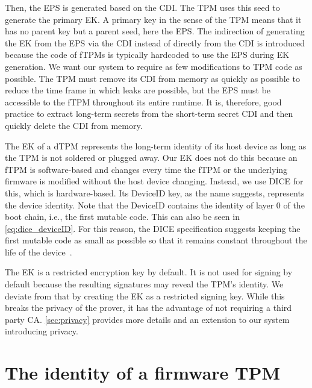 Then, the \ac{EPS} is generated based on the \ac{CDI}\@.
The \ac{TPM} uses this seed to generate the primary \ac{EK}.
A primary key in the sense of the TPM means that it has no parent key but a parent seed, here the \ac{EPS}\@.
The indirection of generating the \ac{EK} from the \ac{EPS} via the \ac{CDI} instead of directly from the \ac{CDI} is introduced because the code of fTPMs is typically hardcoded to use the \ac{EPS} during \ac{EK} generation.
We want our system to require as few modifications to TPM code as possible.
The \ac{TPM} must remove its \ac{CDI} from memory as quickly as possible to reduce the time frame in which leaks are possible, but the \ac{EPS} must be accessible to the \ac{fTPM} throughout its entire runtime.
It is, therefore, good practice to extract long-term secrets from the short-term secret \ac{CDI} and then quickly delete the \ac{CDI} from memory.


The \ac{EK} of a \ac{dTPM} represents the long-term identity of its host device as long as the \ac{TPM} is not soldered or plugged away.
Our \ac{EK} does not do this because an \ac{fTPM} is software-based and changes every time the \ac{fTPM} or the underlying firmware is modified without the host device changing.
Instead, we use \ac{DICE} for this, which is hardware-based.
Its DeviceID key, as the name suggests, represents the device identity.
Note that the DeviceID contains the identity of layer 0 of the boot chain, i.e., the first mutable code.
This can also be seen in \autoref{eq:dice_deviceID}.
For this reason, the DICE specification suggests keeping the first mutable code as small as possible so that it remains constant throughout the life of the device~\cite{dice-layering-arch}.


The \ac{EK} is a restricted encryption key by default.
It is not used for signing by default because the resulting signatures may reveal the TPM's identity.
We deviate from that by creating the \ac{EK} as a restricted signing key.
While this breaks the privacy of the prover, it has the advantage of not requiring a third party \ac{CA}\@.
\autoref{sec:privacy} provides more details and an extension to our system introducing privacy.

\section{The identity of a firmware TPM}\label{sec:ftpm-identity}

